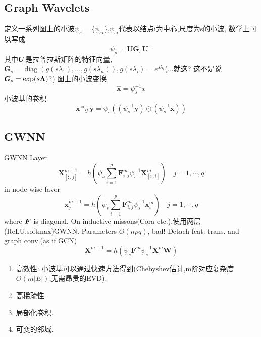 \documentclass{article}
\begin{document}
\subsection{Graph Wavelets}
    定义一系列图上的小波$\psi_s=\{\psi_{si}\}$,$\psi_{si}$代表以结点i为中心,尺度为s的小波, 数学上可以写成
    \begin{equation}
        \psi_{s}=\boldsymbol{U} \boldsymbol{G}_{s} \boldsymbol{U}^{\top}
    \end{equation}
    其中$\boldsymbol{U}$是拉普拉斯矩阵的特征向量, $\boldsymbol{G}_{s}=\operatorname{diag}\left(g\left(s \lambda_{1}\right), \ldots, g\left(s \lambda_{n}\right)\right), g(s\lambda_i)=e^{s\lambda_i}$(...就这? 这不是说$\boldsymbol{G}_{s}=\exp(s\boldsymbol{\Lambda})$?)
    图上的小波变换
    \begin{equation}
        \hat{\boldsymbol{x}}=\psi_{s}^{-1} x
    \end{equation}
    小波基的卷积
    \begin{equation}
        \boldsymbol{x} *_{\mathcal{G}} \boldsymbol{y}=\psi_{s}\left(\left(\psi_{s}^{-1} \boldsymbol{y}\right) \odot\left(\psi_{s}^{-1} \boldsymbol{x}\right)\right)
    \end{equation}

\subsection{GWNN}

    GWNN Layer
    \begin{equation}
        \boldsymbol{X}_{[:, j]}^{m+1}=h\left(\psi_{s} \sum_{i=1}^{p} \boldsymbol{F}_{i, j}^{m} \psi_{s}^{-1} \boldsymbol{X}_{[:, i]}^{m}\right) \quad j=1, \cdots, q
    \end{equation}
    in node-wise favor
    \begin{equation}
        \boldsymbol{x}_{j}^{m+1}=h\left(\psi_{s} \sum_{i=1}^{p} \boldsymbol{F}_{i, j}^{m} \psi_{s}^{-1} \boldsymbol{x}_{i}^{m}\right) \quad j=1, \cdots, q
    \end{equation}
    where $\boldsymbol{F}$ is diagonal.
    On inductive missons(Cora etc.),使用两层(ReLU,softmax)GWNN. Parameters $O(npq)$, bad!
    Detach feat. trans. and graph conv.(as if GCN)
    \begin{equation}
        \boldsymbol{X}^{m+1}=h\left(\psi_{s} \boldsymbol{F}^{m} \psi_{s}^{-1} \boldsymbol{X}^{m} \boldsymbol{W}\right)
    \end{equation}

     \begin{enumerate}
        \item 高效性: 小波基可以通过快速方法得到(Chebyshev估计,m阶对应复杂度$O(m|E|)$,无需昂贵的EVD).
        \item 高稀疏性.
        \item 局部化卷积.
        \item 可变的邻域.
    \end{enumerate}
\end{document}
